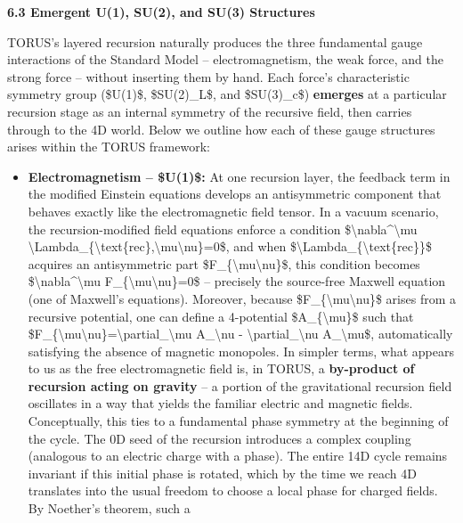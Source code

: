 \documentclass[]{article}
\begin{document}
\textbf{6.3 Emergent U(1), SU(2), and SU(3) Structures}

TORUS's layered recursion naturally produces the three fundamental gauge
interactions of the Standard Model -- electromagnetism, the weak force,
and the strong force -- without inserting them by hand. Each force's
characteristic symmetry group (\$U(1)\$, \$SU(2)\_L\$, and \$SU(3)\_c\$)
\textbf{emerges} at a particular recursion stage as an internal symmetry
of the recursive field, then carries through to the 4D world. Below we
outline how each of these gauge structures arises within the TORUS
framework:

\begin{itemize}
\item
  \textbf{Electromagnetism -- \$U(1)\$:} At one recursion layer, the
  feedback term in the modified Einstein equations develops an
  antisymmetric component that behaves exactly like the electromagnetic
  field tensor. In a vacuum scenario, the recursion-modified field
  equations enforce a condition
  \$\textbackslash{}nabla\^{}\textbackslash{}mu
  \textbackslash{}Lambda\_\{\textbackslash{}text\{rec\},\textbackslash{}mu\textbackslash{}nu\}=0\$,
  and when \$\textbackslash{}Lambda\_\{\textbackslash{}text\{rec\}\}\$
  acquires an antisymmetric part
  \$F\_\{\textbackslash{}mu\textbackslash{}nu\}\$, this condition
  becomes \$\textbackslash{}nabla\^{}\textbackslash{}mu
  F\_\{\textbackslash{}mu\textbackslash{}nu\}=0\$ -- precisely the
  source-free Maxwell equation (one of Maxwell's equations)​. Moreover,
  because \$F\_\{\textbackslash{}mu\textbackslash{}nu\}\$ arises from a
  recursive potential, one can define a 4-potential
  \$A\_\{\textbackslash{}mu\}\$ such that
  \$F\_\{\textbackslash{}mu\textbackslash{}nu\}=\textbackslash{}partial\_\textbackslash{}mu
  A\_\textbackslash{}nu - \textbackslash{}partial\_\textbackslash{}nu
  A\_\textbackslash{}mu\$, automatically satisfying the absence of
  magnetic monopoles​. In simpler terms, what appears to us as the free
  electromagnetic field is, in TORUS, a \textbf{by-product of recursion
  acting on gravity} -- a portion of the gravitational recursion field
  oscillates in a way that yields the familiar electric and magnetic
  fields​. Conceptually, this ties to a fundamental phase symmetry at
  the beginning of the cycle. The 0D seed of the recursion introduces a
  complex coupling (analogous to an electric charge with a phase). The
  entire 14D cycle remains invariant if this initial phase is rotated,
  which by the time we reach 4D translates into the usual freedom to
  choose a local phase for charged fields​. By Noether's theorem, such a

\end{itemize}
\end{document}
